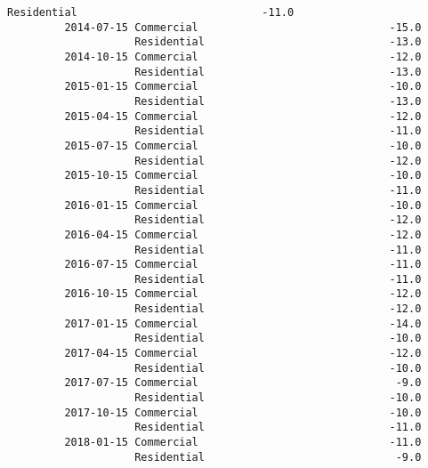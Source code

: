 \documentclass[11pt]{article}
\begin{document}
\begin{Verbatim}[commandchars=\\\{\}]
                    Residential                             -11.0   
         2014-07-15 Commercial                              -15.0   
                    Residential                             -13.0   
         2014-10-15 Commercial                              -12.0   
                    Residential                             -13.0   
         2015-01-15 Commercial                              -10.0   
                    Residential                             -13.0   
         2015-04-15 Commercial                              -12.0   
                    Residential                             -11.0   
         2015-07-15 Commercial                              -10.0   
                    Residential                             -12.0   
         2015-10-15 Commercial                              -10.0   
                    Residential                             -11.0   
         2016-01-15 Commercial                              -10.0   
                    Residential                             -12.0   
         2016-04-15 Commercial                              -12.0   
                    Residential                             -11.0   
         2016-07-15 Commercial                              -11.0   
                    Residential                             -11.0   
         2016-10-15 Commercial                              -12.0   
                    Residential                             -12.0   
         2017-01-15 Commercial                              -14.0   
                    Residential                             -10.0   
         2017-04-15 Commercial                              -12.0   
                    Residential                             -10.0   
         2017-07-15 Commercial                               -9.0   
                    Residential                             -10.0   
         2017-10-15 Commercial                              -10.0   
                    Residential                             -11.0   
         2018-01-15 Commercial                              -11.0   
                    Residential                              -9.0   
         

\end{Verbatim}
\end{document}
